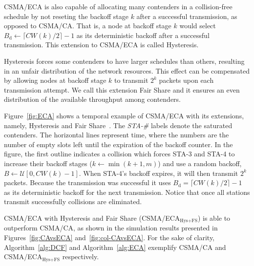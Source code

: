 CSMA/ECA is also capable of allocating many contenders in a collision-free schedule by not reseting the backoff stage $k$ after a successful transmission, as opposed to CSMA/CA. That is, a node at backoff stage $k$ would select $B_{\text{d}}\leftarrow \lceil CW(k)/2\rceil-1$ as its deterministic backoff after a successful transmission. This extension to CSMA/ECA is called Hysteresis. 

Hysteresis forces some contenders to have larger schedules than others, resulting in an unfair distribution of the network resources. This effect can be compensated by allowing nodes at backoff stage $k$ to transmit $2^{k}$ packets upon each transmission attempt. We call this extension Fair Share and it ensures an even distribution of the available throughput among contenders.

Figure~\ref{fig:ECA} shows a temporal example of CSMA/ECA with its extensions, namely, Hysteresis and Fair Share~\cite{sanabria2014high}. The \emph{STA-\#} labels denote the saturated contenders. The horizontal lines represent time, where the numbers are the number of empty slots left until the expiration of the backoff counter. In the figure, the first outline indicates a collision which forces STA-3 and STA-4 to increase their backoff stages ($k \leftarrow \min(k+1,m)$) and use a random backoff, $B\leftarrow\mathcal{U}[0,CW(k)-1]$. When STA-4's backoff expires, it will then transmit $2^{k}$ packets. Because the transmission was successful it uses $B_{\text{d}}=\lceil CW(k)/2\rceil-1$ as its deterministic backoff for the next transmission. Notice that once all stations transmit successfully collisions are eliminated.

CSMA/ECA with Hysteresis and Fair Share (CSMA/ECA$_{\text{Hys+FS}}$) is able to outperform CSMA/CA, as shown in the simulation results presented in Figures~\ref{fig:CAvsECA} and~\ref{fig:col-CAvsECA}. For the sake of clarity, Algorithm~\ref{alg:DCF} and Algorithm~\ref{alg:ECA} exemplify CSMA/CA and CSMA/ECA$_{\text{Hys+FS}}$ respectively.


